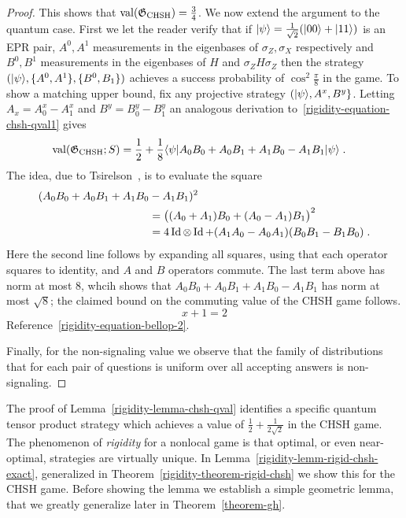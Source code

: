 \begin{proof}
This shows that $\mathrm{val}(\mathfrak{G}_{\mathrm{CHSH}})=\frac{3}{4}$. We now extend the argument to the quantum case. First we let the reader verify that if $|\psi\rangle = \frac{1}{\sqrt{2}} (|00\rangle + |11\rangle)$ is an EPR pair, $A^0, A^1$ measurements in the eigenbases of $\sigma_Z,\sigma_X$ respectively and $B^0,B^1$ measurements in the eigenbases of $H$ and $\sigma_Z H \sigma_Z$ then the strategy $(|\psi\rangle,\{A^0,A^1\},\{B^0,B_1\})$ achieves a success probability of $\cos^2 \frac{\pi}{8}$ in the game. To show a matching upper bound, fix any projective strategy $(|\psi\rangle, A^x,B^y\}$. Letting $A_x = A^x_0-A^x_1$ and  $B^y = B^y_0-B^y_1$ an analogous derivation to~\eqref{rigidity-equation-chsh-qval1} gives 
\begin{align*}
\mathrm{val}(\mathfrak{G}_{\mathrm{CHSH}};{S}) &=\frac{1}{2} + \frac{1}{8}\langle\psi| A_0 B_0 + A_0 B_1 + A_1 B_0 - A_1 B_1 |\psi\rangle\;.
\end{align*}
The idea, due to Tsirelson~\cite{cirel1980quantum}, is to evaluate the square
\begin{align}
(A_0 B_0 + A_0 B_1 + A_1 B_0 &- A_1 B_1 )^2\label{equation-bellop}\\
 &=\big( (A_0+A_1) B_0 + (A_0-A_1) B_1 \big)^2\notag\\
&= 4\mathop{\rm Id}\nolimits\otimes \mathop{\rm Id}\nolimits + (A_1A_0-A_0A_1) (B_0B_1-B_1B_0)\;.\notag
\end{align}
Here the second line follows by expanding all squares, using that each operator squares to identity, and $A$ and $B$ operators commute. The last term above has norm at most $8$, whcih shows that $A_0 B_0 + A_0 B_1 + A_1 B_0 - A_1 B_1 $ has norm at most $\sqrt{8}$; the claimed bound on the commuting value of the CHSH game  follows. 
\begin{equation}\label{equation-bellop-2}
x+1=2
\end{equation}
Reference~\ref{rigidity-equation-bellop-2}.

Finally, for the non-signaling value we observe that the family of distributions that for each pair of questions is uniform over all accepting answers is non-signaling. 
\end{proof}


The proof of Lemma~\ref{rigidity-lemma-chsh-qval} identifies a specific quantum tensor product strategy which achieves a value of $\frac{1}{2} + \frac{1}{2\sqrt{2}}$ in the CHSH game. The phenomenon of \emph{rigidity} for a nonlocal game is that optimal, or even near-optimal, strategies are virtually unique. In Lemma~\ref{rigidity-lemm-rigid-chsh-exact}, generalized in Theorem~\ref{rigidity-theorem-rigid-chsh} we show this for the CHSH game. Before showing the lemma we establish a simple geometric lemma, that we greatly generalize later in Theorem~\ref{theorem-gh}. 

